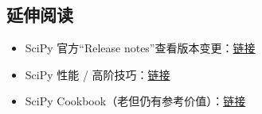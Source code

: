 \subsection{延伸阅读}\label{ux5ef6ux4f38ux9605ux8bfb-16}

\begin{itemize}
\tightlist
\item
  SciPy 官方``Release
  notes''查看版本变更：\href{https://docs.scipy.org/doc/scipy/release.html}{链接}
\item
  SciPy 性能 / 高阶技巧：\href{https://scipy-lectures.org/}{链接}
\item
  SciPy
  Cookbook（老但仍有参考价值）：\href{https://scipy.github.io/old-wiki/pages/Cookbook/}{链接}
\end{itemize}

\newpage
